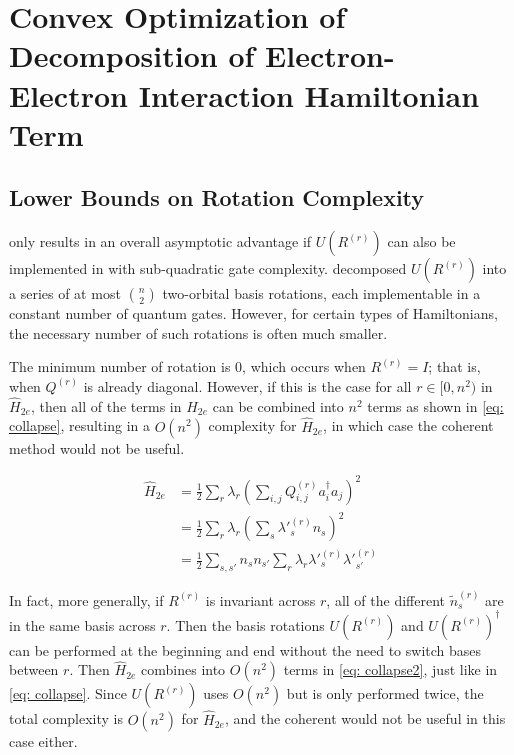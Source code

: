 

\chapter{Convex Optimization of Decomposition of Electron-Electron Interaction Hamiltonian Term}

\section{Lower Bounds on Rotation Complexity}

only results in an overall asymptotic advantage if $U(R^{(r)})$ can also be implemented in with sub-quadratic gate complexity. \cite{FSN} decomposed $U(R^{(r)})$ into a series of at most ${n \choose 2}$ two-orbital basis rotations, each implementable in a constant number of quantum gates. However, for certain types of Hamiltonians, the necessary number of such rotations is often much smaller.

The minimum number of rotation is $0$, which occurs when $R^{(r)} = I$; that is, when $Q^{(r)}$ is already diagonal. However, if this is the case for all $r \in [0, n^2)$ in $\hat{H}_{2e}$, then all of the terms in $\hat{H}_{2e}$ can be combined into $n^2$ terms as shown in \eqref{eq: collapse}, resulting in a $O(n^2)$ complexity for $\hat{H}_{2e}$, in which case the coherent method would not be useful.

\begin{equation}
    \begin{split}
        \hat{H}_{2e} &= \frac{1}{2}\sum_r\lambda_r\left(\sum_{i,j} Q^{(r)}_{i, j}a^\dag_ia_j\right)^2 \\
        &= \frac{1}{2}\sum_r\lambda_r(\sum_{s} \lambda'^{(r)}_sn_s)^2 \\
        &= \frac{1}{2}\sum_{s, s'} n_sn_{s'}\sum_r\lambda_r\lambda'^{(r)}_s\lambda'^{(r)}_{s'}
    \end{split}
    \label{eq: collapse}
\end{equation}

In fact, more generally, if $R^{(r)}$ is invariant across $r$, all of the different $\tilde{n}^{(r)}_s$ are in the same basis across $r$. Then the basis rotations $U(R^{(r)})$ and $U(R^{(r)})^\dag$ can be performed at the beginning and end without the need to switch bases between $r$. Then $\hat{H}_{2e}$ combines into $O(n^2)$ terms in \eqref{eq: collapse2}, just like in \eqref{eq: collapse}. Since $U(R^{(r)})$ uses $O(n^2)$ but is only performed twice, the total complexity is $O(n^2)$ for $\hat{H}_{2e}$, and the coherent would not be useful in this case either.

